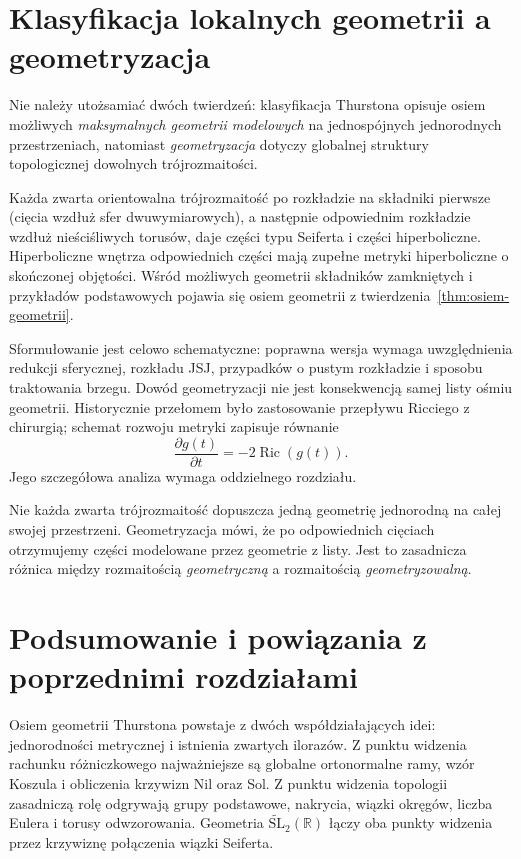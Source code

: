 \section{Klasyfikacja lokalnych geometrii a geometryzacja}

Nie należy utożsamiać dwóch twierdzeń: klasyfikacja Thurstona
opisuje osiem możliwych \emph{maksymalnych geometrii modelowych}
na jednospójnych jednorodnych przestrzeniach, natomiast
\emph{geometryzacja} dotyczy globalnej struktury topologicznej
dowolnych trójrozmaitości.

\begin{twierdzenie}
Każda zwarta orientowalna trójrozmaitość po rozkładzie na
składniki pierwsze (cięcia wzdłuż sfer dwuwymiarowych),
a następnie odpowiednim rozkładzie wzdłuż nieściśliwych
torusów, daje części typu Seiferta i części hiperboliczne.
Hiperboliczne wnętrza odpowiednich części mają zupełne
metryki hiperboliczne o skończonej objętości.
Wśród możliwych geometrii składników zamkniętych i
przykładów podstawowych pojawia się osiem geometrii
z twierdzenia~\ref{thm:osiem-geometrii}.
\end{twierdzenie}

Sformułowanie jest celowo schematyczne: poprawna wersja
wymaga uwzględnienia redukcji sferycznej, rozkładu JSJ,
przypadków o pustym rozkładzie i sposobu traktowania brzegu.
Dowód geometryzacji nie jest konsekwencją samej listy ośmiu
geometrii. Historycznie przełomem było zastosowanie przepływu
Ricciego z chirurgią; schemat rozwoju metryki zapisuje
równanie
\[
 \frac{\partial g(t)}{\partial t}=-2\operatorname{Ric}(g(t)).
\]
Jego szczegółowa analiza wymaga oddzielnego rozdziału.

\begin{uwaga}
Nie każda zwarta trójrozmaitość dopuszcza jedną geometrię
jednorodną na całej swojej przestrzeni. Geometryzacja mówi,
że po odpowiednich cięciach otrzymujemy części modelowane
przez geometrie z listy. Jest to zasadnicza różnica między
rozmaitością \emph{geometryczną} a rozmaitością
\emph{geometryzowalną}.
\end{uwaga}

\section{Podsumowanie i powiązania z poprzednimi rozdziałami}

Osiem geometrii Thurstona powstaje z dwóch współdziałających
idei: jednorodności metrycznej i istnienia zwartych ilorazów.
Z punktu widzenia rachunku różniczkowego najważniejsze są
globalne ortonormalne ramy, wzór Koszula i obliczenia krzywizn
Nil oraz Sol. Z punktu widzenia topologii zasadniczą rolę
odgrywają grupy podstawowe, nakrycia, wiązki okręgów, liczba
Eulera i torusy odwzorowania. Geometria
$\widetilde{\mathrm{SL}}_2(\mathbb R)$ łączy oba punkty widzenia
przez krzywiznę połączenia wiązki Seiferta.


